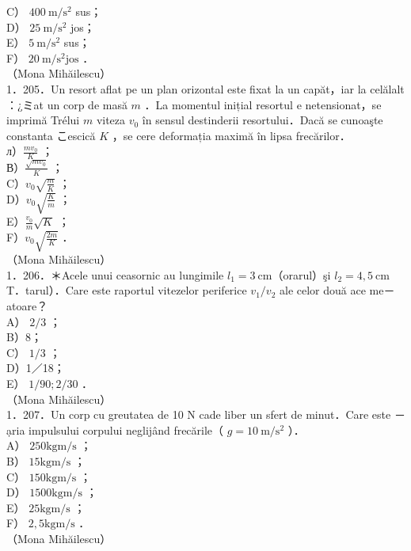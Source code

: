 \documentclass[10pt]{article}
\begin{document}
C） $400 \mathrm{~m} / \mathrm{s}^{2}$ sus；\\
D） $25 \mathrm{~m} / \mathrm{s}^{2}$ jos；\\
E） $5 \mathrm{~m} / \mathrm{s}^{2}$ sus；\\
F） $20 \mathrm{~m} / \mathrm{s}^{2} \mathrm{jos}$ ．\\
（Mona Mihăilescu）\\
1．205．Un resort aflat pe un plan orizontal este fixat la un capăt，iar la celălalt ：¿ミat un corp de masă $m$ ．La momentul inițial resortul e netensionat，se imprimă Trélui $m$ viteza $v_{0}$ în sensul destinderii resortului．Dacă se cunoaşte constanta こescică $K$ ，se cere deformația maximă în lipsa frecărilor．\\
л）$\frac{m v_{0}}{K}$ ；\\
В）$\frac{\sqrt{m v_{0}}}{K}$ ；\\
C）$v_{0} \sqrt{\frac{m}{K}}$ ；\\
D）$v_{0} \sqrt{\frac{K}{m}}$ ；\\
E）$\frac{v_{0}}{m} \sqrt{K}$ ；\\
F）$v_{0} \sqrt{\frac{2 m}{K}}$ ．\\
（Mona Mihăilescu）\\
1．206．＊Acele unui ceasornic au lungimile $l_{1}=3 \mathrm{~cm}$（orarul）şi $l_{2}=4,5 \mathrm{~cm}$ T．tarul）．Care este raportul vitezelor periferice $v_{1} / v_{2}$ ale celor două ace me－atoare？\\
A） $2 / 3$ ；\\
B）8；\\
C） $1 / 3$ ；\\
D）1／18；\\
E） $1 / 90 ; 2 / 30$ ．\\
（Mona Mihăilescu）\\
1．207．Un corp cu greutatea de 10 N cade liber un sfert de minut．Care este －ạria impulsului corpului neglijând frecările（ $g=10 \mathrm{~m} / \mathrm{s}^{2}$ ）．\\
A） $250 \mathrm{kgm} / \mathrm{s}$ ；\\
B） $15 \mathrm{kgm} / \mathrm{s}$ ；\\
C） $150 \mathrm{kgm} / \mathrm{s}$ ；\\
D） $1500 \mathrm{kgm} / \mathrm{s}$ ；\\
E） $25 \mathrm{kgm} / \mathrm{s}$ ；\\
F） $2,5 \mathrm{kgm} / \mathrm{s}$ ．\\
（Mona Mihăilescu）\\
\end{document}
